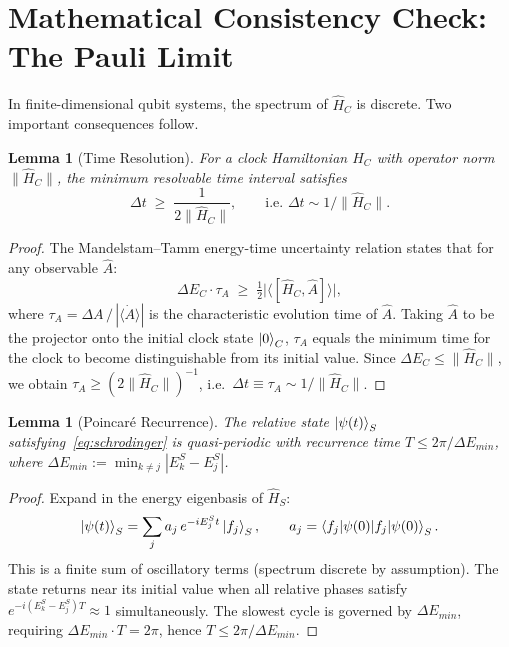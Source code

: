 \documentclass[11pt,a4paper]{article}
\newtheorem{lemma}[theorem]{Lemma}
\theoremstyle{definition}
\theoremstyle{remark}
\begin{document}
\section{Mathematical Consistency Check: The Pauli Limit}

In finite-dimensional qubit systems, the spectrum of $\hat{H}_C$ is discrete.
Two important consequences follow.

\begin{lemma}[Time Resolution]\label{lem:tres}
For a clock Hamiltonian $\hat{H}_C$ with operator norm $\|\hat{H}_C\|$, the minimum
resolvable time interval satisfies
\[
  \Delta t \;\ge\; \frac{1}{2\|\hat{H}_C\|},
  \qquad\text{i.e.\ }\Delta t\sim 1/\|\hat{H}_C\|.
\]
\end{lemma}
\begin{proof}
The Mandelstam--Tamm energy-time uncertainty relation states that for any observable $\hat{A}$:
\[
  \Delta E_C\cdot\tau_A \;\ge\; \tfrac{1}{2}\bigl|\langle[\hat{H}_C,\hat{A}]\rangle\bigr|,
\]
where $\tau_A=\Delta A\,/\,|\langle\dot{A}\rangle|$ is the characteristic evolution time of
$\hat{A}$.
Taking $\hat{A}$ to be the projector onto the initial clock state $\ket{0}_C$,
$\tau_A$ equals the minimum time for the clock to become distinguishable from its initial value.
Since $\Delta E_C\le\|\hat{H}_C\|$, we obtain
$\tau_A\ge(2\|\hat{H}_C\|)^{-1}$, i.e.\ $\Delta t\equiv\tau_A\sim 1/\|\hat{H}_C\|$.
\end{proof}

\begin{lemma}[Poincar\'e Recurrence]\label{lem:recurrence}
The relative state $\ket{\psi(t)}_S$ satisfying~\eqref{eq:schrodinger} is quasi-periodic
with recurrence time $T\le 2\pi/\Delta E_{min}$, where
$\Delta E_{min}:=\min_{k\neq j}|E_k^S-E_j^S|$.
\end{lemma}
\begin{proof}
Expand in the energy eigenbasis of $\hat{H}_S$:
\[
  \ket{\psi(t)}_S = \sum_j a_j\,e^{-iE_j^S t}\ket{f_j}_S, \qquad
  a_j=\braket{f_j|\psi(0)}_S.
\]
This is a finite sum of oscillatory terms (spectrum discrete by assumption).
The state returns near its initial value when all relative phases satisfy
$e^{-i(E_k^S-E_j^S)T}\approx 1$ simultaneously.
The slowest cycle is governed by $\Delta E_{min}$, requiring
$\Delta E_{min}\cdot T=2\pi$, hence $T\le 2\pi/\Delta E_{min}$.
\end{proof}
\end{document}
